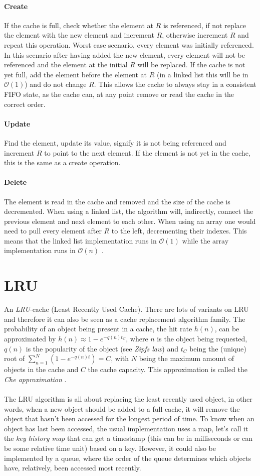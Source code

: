 \documentclass[pdftex,a4paper,12pt,twoside]{report}
\begin{document}
\paragraph{Create} If the cache is full, check whether the element at $R$ is referenced, if not replace the element with the new element and increment $R$, otherwise increment $R$ and repeat this operation. Worst case scenario, every element was initially referenced. In this scenario after having added the new element, every element will not be referenced and the element at the initial $R$ will be replaced. If the cache is not yet full, add the element before the element at $R$ (in a linked list this will be in $\mathcal{O}(1)$) and do not change $R$. This allows the cache to always stay in a consistent FIFO state, as the cache can, at any point remove or read the cache in the correct order.
\paragraph{Update} Find the element, update its value, signify it is not being referenced and increment $R$ to point to the next element. If the element is not yet in the cache, this is the same as a create operation.
\paragraph{Delete} The element is read in the cache and removed and the size of the cache is decremented. When using a linked list, the algorithm will, indirectly, connect the previous element and next element to each other. When using an array one would need to pull every element after $R$ to the left, decrementing their indexes. This means that the linked list implementation runs in $\mathcal{O}(1)$ while the array implementation runs in $\mathcal{O}(n)$ \citep{clock_cpan}.
\section{LRU}
An \emph{LRU}-cache (Least Recently Used Cache). There are lots of variants on LRU and therefore it can also be seen as a cache replacement algorithm family. The probability of an object being present in a cache, the hit rate $h(n)$, can be approximated by 
$h(n) \approx 1 - e^{-q(n)t_C}$, where $n$ is the object being requested, $q(n)$ is the popularity of the object (see \emph{Zipfs law}) and $t_C$ being the (unique) root of 
$\sum_{n=1}^N(1-e^{-q(n)t})=C$, with $N$ being the maximum amount of objects in the cache and $C$ the cache capacity. This approximation is called the \emph{Che approximation} \citep{fricker2012versatile}.
\\\\
The LRU algorithm is all about replacing the least recently used object, in other words, when a new object should be added to a full cache, it will remove the object that hasn't been accessed for the longest period of time. To know when an object has last been accessed, the usual implementation uses a map, let's call it the \emph{key history map} that can get a timestamp (this can be in milliseconds or can be some relative time unit) based on a key. However, it could also be implemented by a queue, where the order of the queue determines which objects have, relatively, been accessed most recently.
\end{document}
